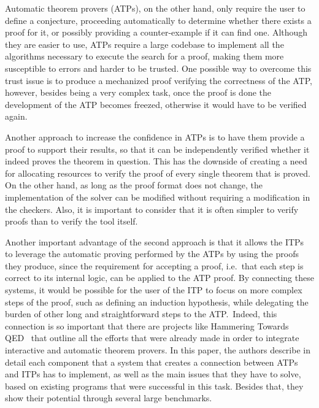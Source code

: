 Automatic theorem provers (ATPs), on the other hand,
only require the user to define a conjecture, proceeding automatically to
determine whether there exists a proof for it, or possibly providing a
counter-example if it can find one.
%
Although they are easier to use, ATPs require a large
codebase to implement all the algorithms necessary to execute the search for a proof,
making them more susceptible to errors and harder to be trusted.
One possible way to overcome this trust issue is to produce
a mechanized proof verifying the correctness of the ATP, however,
besides being a very complex task, once the proof is done the
development of the ATP becomes freezed, otherwise it would
have to be verified again.

Another approach to increase the confidence in ATPs is to have them provide a
proof to support their results, so that it can be independently verified whether
it indeed proves the theorem in question. This has the downside of creating a need
for allocating resources to verify the proof of every single theorem that is proved.
On the other hand, as long as the proof format does not change, the implementation
of the solver can be modified without requiring a modification in the checkers. Also,
it is important to consider that it is often simpler to verify proofs than to verify
the tool itself.

Another important advantage of the second approach is that it allows the ITPs to leverage the automatic proving performed by the ATPs by using the proofs they produce, since the requirement for accepting a proof, i.e.\ that each step is correct to its internal logic,
can be applied to the ATP proof.
%
By connecting these systems, it would be possible for the user of the ITP to focus on more complex steps of the proof, such as defining an induction hypothesis, while delegating the burden of other long and straightforward steps to the ATP.\ Indeed, this
connection is so important that there are projects like Hammering Towards QED~\cite{hammering}
that outline all the efforts that were already made in order to integrate
interactive and automatic theorem provers. In this paper, the authors describe in detail each component that a system that creates a connection between ATPs and ITPs has to implement, as well as the main issues that they have to solve, based on existing programs that were successful in this task. Besides that, they show their potential through several large benchmarks. 

